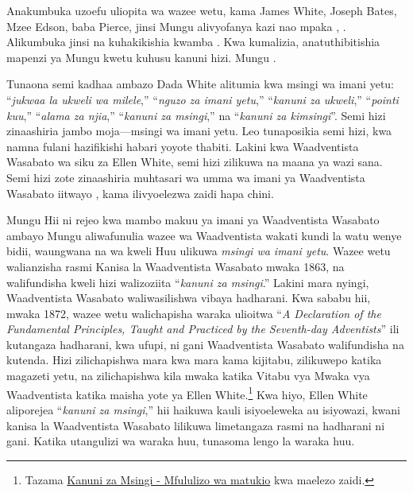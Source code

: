 Anakumbuka uzoefu uliopita wa wazee wetu, kama James White, Joseph Bates, Mzee Edson, baba Pierce, jinsi Mungu alivyofanya kazi nao mpaka , . Alikumbuka jinsi  na kuhakikishia kwamba . Kwa kumalizia, anatuthibitishia mapenzi ya Mungu kwetu kuhusu kanuni hizi. Mungu .


Tunaona semi kadhaa ambazo Dada White alitumia kwa msingi wa imani yetu: “\textit{jukwaa la ukweli wa milele},” “\textit{nguzo za imani yetu},” “\textit{kanuni za ukweli},” “\textit{pointi kuu},” “\textit{alama za njia},” “\textit{kanuni za msingi},” na “\textit{kanuni za kimsingi}”. Semi hizi zinaashiria jambo moja—msingi wa imani yetu. Leo tunaposikia semi hizi, kwa namna fulani hazifikishi habari yoyote thabiti. Lakini kwa Waadventista Wasabato wa siku za Ellen White, semi hizi zilikuwa na maana ya wazi sana. Semi hizi zote zinaashiria muhtasari wa umma wa imani ya Waadventista Wasabato iitwayo , kama ilivyoelezwa zaidi hapa chini.


Mungu  Hii ni rejeo kwa mambo makuu ya imani ya Waadventista Wasabato ambayo Mungu aliwafunulia wazee wa Waadventista  wakati kundi la watu wenye bidii, waungwana na wa kweli  Huu ulikuwa \textit{msingi wa imani yetu}. Wazee wetu walianzisha rasmi Kanisa la Waadventista Wasabato mwaka 1863, na walifundisha kweli hizi walizoziita “\textit{kanuni za msingi}.” Lakini mara nyingi, Waadventista Wasabato waliwasilishwa vibaya hadharani. Kwa sababu hii, mwaka 1872, wazee wetu walichapisha waraka ulioitwa “\textit{A Declaration of the Fundamental Principles, Taught and Practiced by the Seventh-day Adventists}” ili kutangaza hadharani, kwa ufupi, ni  gani Waadventista Wasabato walifundisha na kutenda. Hizi  zilichapishwa mara kwa mara kama kijitabu, zilikuwepo katika magazeti yetu, na zilichapishwa kila mwaka katika Vitabu vya Mwaka vya Waadventista katika maisha yote ya Ellen White.\footnote{Tazama \hyperref[appendix:timeline]{Kanuni za Msingi - Mfululizo wa matukio} kwa maelezo zaidi.} Kwa hiyo, Ellen White aliporejea “\textit{kanuni za msingi},” hii haikuwa kauli isiyoeleweka au isiyowazi, kwani kanisa la Waadventista Wasabato lilikuwa limetangaza rasmi na hadharani ni  gani. Katika utangulizi wa waraka huu, tunasoma lengo la waraka huu.


